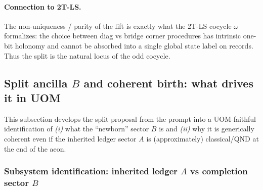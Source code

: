 \documentclass[11pt]{article}
\theoremstyle{definition}
\theoremstyle{plain}
\theoremstyle{remark}
\begin{document}
\paragraph{Connection to 2T-LS.}
The non-uniqueness / parity of the lift is exactly what the 2T-LS cocycle $\omega$ formalizes:
the choice between diag vs bridge corner procedures has intrinsic one-bit holonomy and cannot be absorbed into a
single global state label on records. Thus the split is the natural locus of the odd cocycle.

\subsection{Split ancilla $B$ and coherent birth: what drives it in UOM}
\label{subsec:split-ancilla}

This subsection develops the split proposal from the prompt into a UOM-faithful identification of
\emph{(i)} what the ``newborn'' sector $B$ is and \emph{(ii)} why it is generically coherent even if the inherited ledger
sector $A$ is (approximately) classical/QND at the end of the aeon.

\subsubsection*{Subsystem identification: inherited ledger $A$ vs completion sector $B$}
\label{subsec:AB-identification}
\end{document}
